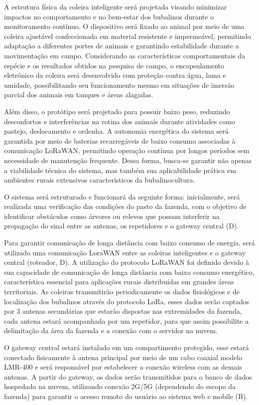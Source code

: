 \documentclass[11pt,a4paper]{article}
\begin{document}
A estrutura física da coleira inteligente será projetada visando minimizar impactos no comportamento e no bem-estar dos bubalinos durante o monitoramento contínuo. O dispositivo
será fixado ao animal por meio de uma coleira ajustável confeccionada em material resistente e
impermeável, permitindo adaptação a diferentes portes de animais e garantindo estabilidade durante a movimentação em campo. Considerando as características comportamentais da espécie
e os resultados obtidos na pesquisa de campo, o encapsulamento eletrônico da coleira será desenvolvido com proteção contra água, lama e umidade, possibilitando seu funcionamento mesmo
em situações de imersão parcial dos animais em tanques e áreas alagadas.

Além disso, o protótipo será projetado para possuir baixo peso, reduzindo desconfortos e
interferências na rotina dos animais durante atividades como pastejo, deslocamento e ordenha.
A autonomia energética do sistema será garantida por meio de baterias recarregáveis de baixo
consumo associadas à comunicação LoRaWAN, permitindo operação contínua por longos períodos sem necessidade de manutenção frequente. Dessa forma, busca-se garantir não apenas
a viabilidade técnica do sistema, mas também sua aplicabilidade prática em ambientes rurais
extensivos característicos da bubalinocultura.

O sistema será estruturado e funcionará da seguinte forma: inicialmente, será realizada uma
verificação das condições do pasto da fazenda, com o objetivo de identificar obstáculos como
árvores ou relevos que possam interferir na propagação do sinal entre as antenas, os repetidores
e o gateway central (D).

Para garantir comunicação de longa distância com baixo consumo de energia, será utilizado
uma comunicação LoraWAN entre as coleiras inteligentes e o gateway central (roteador, D).
A utilização do protocolo LoRaWAN foi definido devido à sua capacidade de comunicação de
longa distância com baixo consumo energético, característica essencial para aplicações rurais
distribuídas em grandes áreas territoriais. As coleiras transmitirão periodicamente os dados
fisiológicos e de localização dos bubalinos através do protocolo LoRa, esses dados serão captados
por 3 antenas secundárias que estarão dispostas nas extremidades da fazenda, cada antena estará
acompanhada por um repetidor, para que assim possibilite a delimitação da área da fazenda e
a conexão com o servidor na nuvem.

O gateway central estará instalado em um compartimento protegido, esse estará conectado
fisicamente à antena principal por meio de um cabo coaxial modelo LMR-400 e será responsável
por estabelecer a conexão wireless com as demais antenas. A partir do gateway, os dados
serão transmitidos para o banco de dados hospedado na nuvem, utilizando conexão 2G/5G (dependendo do escopo da fazenda) para garantir o acesso remoto do usuário ao sistema web e
mobile (B).
\end{document}
